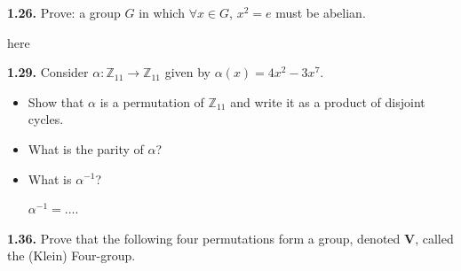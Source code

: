\documentclass[12pt]{article}
\newcommand{\zee}{\mathbb{Z}}
\begin{document}
%
%
%
%
%


\textbf{1.26.} Prove: a group $G$ in which $\forall x\in G$, $x^2=e$ must be abelian.

\bigskip

here

\vspace{1in}

\textbf{1.29.} Consider $\alpha: \zee_{11}\to \zee_{11}$ given by $\alpha(x)=4x^2-3x^7$.
\begin{itemize}
	\item Show that $\alpha$ is a permutation of $\zee_{11}$ and write it as a product of disjoint cycles.

	\bigskip

	\item What is the parity of $\alpha$?

	\bigskip

	\item What is $\alpha^{-1}$?

	\bigskip

	$\alpha^{-1}=...$.
\end{itemize}


\textbf{1.36.} Prove that the following four permutations form a group, denoted $\mathbf{V}$, called the (Klein) Four-group.
\end{document}

